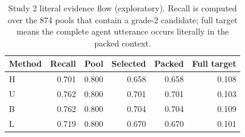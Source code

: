 \begin{table}[htbp]\centering\small
\caption{Study 2 literal evidence flow (exploratory). Recall is computed over the 874 pools that contain a grade-2 candidate; full target means the complete agent utterance occurs literally in the packed context.}\label{tab:flow2}
\begin{tabular}{lrrrrr}\toprule
Method & Recall & Pool & Selected & Packed & Full target\\\midrule
H & 0.701 & 0.800 & 0.658 & 0.658 & 0.108\\
U & 0.762 & 0.800 & 0.701 & 0.701 & 0.103\\
B & 0.762 & 0.800 & 0.704 & 0.704 & 0.109\\
L & 0.719 & 0.800 & 0.670 & 0.670 & 0.101\\
\bottomrule\end{tabular}\end{table}
